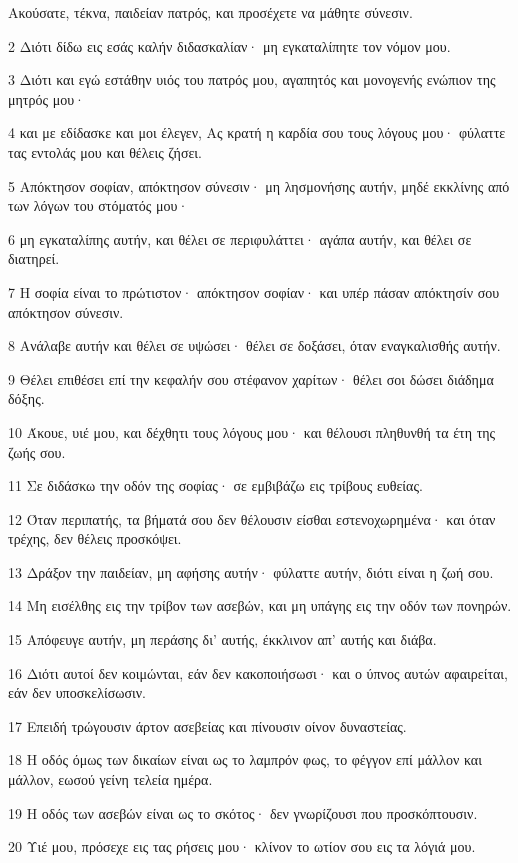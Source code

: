 \par Ακούσατε, τέκνα, παιδείαν πατρός, και προσέχετε να μάθητε σύνεσιν.
\par 2 Διότι δίδω εις εσάς καλήν διδασκαλίαν· μη εγκαταλίπητε τον νόμον μου.
\par 3 Διότι και εγώ εστάθην υιός του πατρός μου, αγαπητός και μονογενής ενώπιον της μητρός μου·
\par 4 και με εδίδασκε και μοι έλεγεν, Ας κρατή η καρδία σου τους λόγους μου· φύλαττε τας εντολάς μου και θέλεις ζήσει.
\par 5 Απόκτησον σοφίαν, απόκτησον σύνεσιν· μη λησμονήσης αυτήν, μηδέ εκκλίνης από των λόγων του στόματός μου·
\par 6 μη εγκαταλίπης αυτήν, και θέλει σε περιφυλάττει· αγάπα αυτήν, και θέλει σε διατηρεί.
\par 7 Η σοφία είναι το πρώτιστον· απόκτησον σοφίαν· και υπέρ πάσαν απόκτησίν σου απόκτησον σύνεσιν.
\par 8 Ανάλαβε αυτήν και θέλει σε υψώσει· θέλει σε δοξάσει, όταν εναγκαλισθής αυτήν.
\par 9 Θέλει επιθέσει επί την κεφαλήν σου στέφανον χαρίτων· θέλει σοι δώσει διάδημα δόξης.
\par 10 Άκουε, υιέ μου, και δέχθητι τους λόγους μου· και θέλουσι πληθυνθή τα έτη της ζωής σου.
\par 11 Σε διδάσκω την οδόν της σοφίας· σε εμβιβάζω εις τρίβους ευθείας.
\par 12 Όταν περιπατής, τα βήματά σου δεν θέλουσιν είσθαι εστενοχωρημένα· και όταν τρέχης, δεν θέλεις προσκόψει.
\par 13 Δράξον την παιδείαν, μη αφήσης αυτήν· φύλαττε αυτήν, διότι είναι η ζωή σου.
\par 14 Μη εισέλθης εις την τρίβον των ασεβών, και μη υπάγης εις την οδόν των πονηρών.
\par 15 Απόφευγε αυτήν, μη περάσης δι' αυτής, έκκλινον απ' αυτής και διάβα.
\par 16 Διότι αυτοί δεν κοιμώνται, εάν δεν κακοποιήσωσι· και ο ύπνος αυτών αφαιρείται, εάν δεν υποσκελίσωσιν.
\par 17 Επειδή τρώγουσιν άρτον ασεβείας και πίνουσιν οίνον δυναστείας.
\par 18 Η οδός όμως των δικαίων είναι ως το λαμπρόν φως, το φέγγον επί μάλλον και μάλλον, εωσού γείνη τελεία ημέρα.
\par 19 Η οδός των ασεβών είναι ως το σκότος· δεν γνωρίζουσι που προσκόπτουσιν.
\par 20 Υιέ μου, πρόσεχε εις τας ρήσεις μου· κλίνον το ωτίον σου εις τα λόγιά μου.
